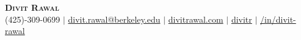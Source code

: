 \begin{center}
    \textbf{\Huge \scshape Divit Rawal} \\ \vspace{1pt}
    \faPhone{} \small (425)-309-0699 $|$ 
    \faEnvelope{} \href{mailto:divit.rawal@berkeley.edu}{divit.rawal@berkeley.edu} $|$ 
    \faGlobe{} \href{https://www.divitrawal.com}{divitrawal.com} $|$
    \faGithub{} \href{https://www.github.com/divitr}{divitr} $|$
    \faLinkedin{} \href{https://www.linkedin.com/in/divit-rawal}{/in/divit-rawal}
\end{center}